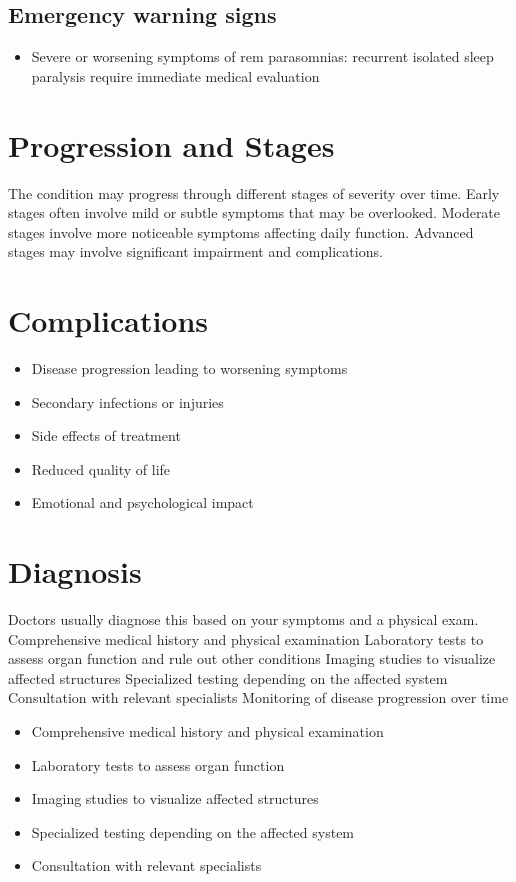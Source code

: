 \subsection{Emergency warning signs}
\begin{itemize}[noitemsep]
  \item Severe or worsening symptoms of rem parasomnias: recurrent isolated sleep paralysis require immediate medical evaluation
\end{itemize}
\section{Progression and Stages}
The condition may progress through different stages of severity over time. Early stages often involve mild or subtle symptoms that may be overlooked. Moderate stages involve more noticeable symptoms affecting daily function. Advanced stages may involve significant impairment and complications.
\section{Complications}
\begin{itemize}[noitemsep]
  \item Disease progression leading to worsening symptoms
  \item Secondary infections or injuries
  \item Side effects of treatment
  \item Reduced quality of life
  \item Emotional and psychological impact
\end{itemize}
\section{Diagnosis}
Doctors usually diagnose this based on your symptoms and a physical exam. Comprehensive medical history and physical examination Laboratory tests to assess organ function and rule out other conditions Imaging studies to visualize affected structures Specialized testing depending on the affected system Consultation with relevant specialists Monitoring of disease progression over time

\begin{itemize}[noitemsep]
  \item Comprehensive medical history and physical examination
  \item Laboratory tests to assess organ function
  \item Imaging studies to visualize affected structures
  \item Specialized testing depending on the affected system
  \item Consultation with relevant specialists
\end{itemize}
